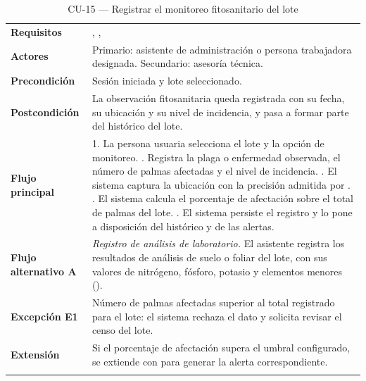 \begin{longtable}{|L{3.4cm}|L{12.0cm}|}
\hline
{}\\
\hline
\textbf{Requisitos} & , ,  \\ \hline
\textbf{Actores} & Primario: asistente de administración o persona trabajadora designada. Secundario: asesoría técnica. \\ \hline
\textbf{Precondición} & Sesión iniciada y lote seleccionado. \\ \hline
\textbf{Postcondición} & La observación fitosanitaria queda registrada con su fecha, su ubicación y su nivel de incidencia, y pasa a formar parte del histórico del lote. \\ \hline
\textbf{Flujo principal} & 1. La persona usuaria selecciona el lote y la opción de monitoreo. . Registra la plaga o enfermedad observada, el número de palmas afectadas y el nivel de incidencia. . El sistema captura la ubicación con la precisión admitida por . . El sistema calcula el porcentaje de afectación sobre el total de palmas del lote. . El sistema persiste el registro y lo pone a disposición del histórico y de las alertas. \\ \hline
\textbf{Flujo alternativo A} & \emph{Registro de análisis de laboratorio.} El asistente registra los resultados de análisis de suelo o foliar del lote, con sus valores de nitrógeno, fósforo, potasio y elementos menores (). \\ \hline
\textbf{Excepción E1} & Número de palmas afectadas superior al total registrado para el lote: el sistema rechaza el dato y solicita revisar el censo del lote. \\ \hline
\textbf{Extensión} & Si el porcentaje de afectación supera el umbral configurado, se extiende con  para generar la alerta correspondiente. \\ \hline
\caption{CU-15 --- Registrar el monitoreo fitosanitario del lote}
\end{longtable}

